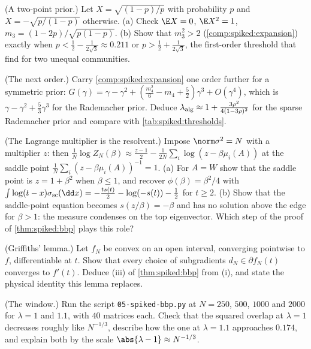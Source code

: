 \begin{refsection}
\begin{exercises}
\item \byhand (A two-point prior.) Let $X=\sqrt{(1-p)/p}$ with probability $p$ and $X=-\sqrt{p/(1-p)}$ otherwise. (a) Check $\E X=0$, $\E X^2=1$, $m_3=(1-2p)/\sqrt{p(1-p)}$. (b) Show that $m_3^2>2$ (\cref{comp:spiked:expansion}) exactly when $p<\frac12-\frac1{2\sqrt3}\approx0.211$ or $p>\frac12+\frac1{2\sqrt3}$, the first-order threshold that \textcite{LesieurKrzakalaZdeborova2017} find for two unequal communities.\label{ex:spiked:twopoint}

\item \byhand\hard (The next order.) Carry \cref{comp:spiked:expansion} one order further for a symmetric prior: $G(\gamma)=\gamma-\gamma^2+(\frac{m_4^2}6-m_4+\frac52)\gamma^3+O(\gamma^4)$, which is $\gamma-\gamma^2+\frac53\gamma^3$ for the Rademacher prior. Deduce $\lambda_{\mathrm{alg}}\approx1+\frac{3\rho^2}{4(1-3\rho)^2}$ for the sparse Rademacher prior and compare with \cref{tab:spiked:thresholds}. \label{ex:spiked:cubic}

\item \translate (The Lagrange multiplier is the resolvent.) Impose $\norm\sigma^2=N$ with a multiplier $z$: then $\frac1N\log Z_N(\beta)\approx\frac{z-1}2-\frac1{2N}\sum_i\log(z-\beta\mu_i(A))$ at the saddle point $\frac1N\sum_i(z-\beta\mu_i(A))^{-1}=1$. (a) For $A=W$ show that the saddle point is $z=1+\beta^2$ when $\beta\le1$, and recover $\phi(\beta)=\beta^2/4$ with $\int\log(t-x)\spikedsc(\dd x)=-\frac{ts(t)}2-\log(-s(t))-\frac12$ for $t\ge2$. (b) Show that the saddle-point equation becomes $s(z/\beta)=-\beta$ and has no solution above the edge for $\beta>1$: the measure condenses on the top eigenvector. Which step of the proof of \cref{thm:spiked:bbp} plays this role?\label{ex:spiked:lagrange}

\item \translate (Griffiths' lemma.) Let $f_N$ be convex on an open interval, converging pointwise to $f$, differentiable at $t$. Show that every choice of subgradients $d_N\in\partial f_N(t)$ converges to $f'(t)$. Deduce (iii) of \cref{thm:spiked:bbp} from (i), and state the physical identity this lemma replaces.\label{ex:spiked:griffiths}

\item \measurement (The window.) Run the script \texttt{05-spiked-bbp.py} at $N=250$, $500$, $1000$ and $2000$ for $\lambda=1$ and $1.1$, with $40$ matrices each. Check that the squared overlap at $\lambda=1$ decreases roughly like $N^{-1/3}$, describe how the one at $\lambda=1.1$ approaches $0.174$, and explain both by the scale $\abs{\lambda-1}\approx N^{-1/3}$.\label{ex:spiked:window}


\end{exercises}
\end{refsection}
